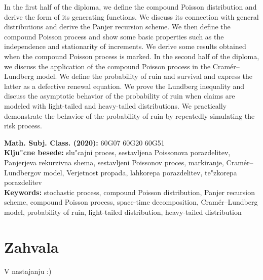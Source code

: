 \documentclass[12pt, a4paper, reqno]{amsart}
\theoremstyle{definition}
\theoremstyle{plain}
\newcommand{\1}{\mathds{1}}
\begin{document}
In the first half of the diploma, we define the compound Poisson distribution and derive the form of its
generating functions. We discuss its connection with general distributions and derive the Panjer recursion scheme.
We then define the compound Poisson process and show some basic properties such as the independence and
stationarity of increments. We derive some results obtained when the compound Poisson process is marked.
In the second half of the diploma, we discuss the application of the compound Poisson process in the Cramér--Lundberg model. 
We define the probability of ruin and survival and express the latter as a defective renewal equation. 
We prove the Lundberg inequality and discuss the asymptotic behavior of the probability of ruin when 
claims are modeled with light-tailed and heavy-tailed distributions. We practically demonstrate the behavior 
of the probability of ruin by repeatedly simulating the risk process.


\vfill\noindent
{\bf Math. Subj. Class. (2020):} 60G07 60G20 60G51 \\[1mm]
{\bf Klju"cne besede:} slu"cajni proces, sestavljena Poissonova porazdelitev, Panjerjeva rekurzivna shema, 
sestavljeni Poissonov proces, markiranje,
 Cramér--Lundbergov model, Verjetnost propada, lahkorepa porazdelitev, te"zkorepa porazdelitev\\[1mm]
{\bf Keywords:} stochastic process, compound Poisson distribution, Panjer recursion scheme, 
compound Poisson process, space-time decomposition,
Cramér--Lundberg model, probability of ruin, light-tailed distribution, heavy-tailed distribution
\pagebreak


\section*{Zahvala}
V nastajanju :) 
%
%
\pagebreak
\end{document}
